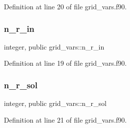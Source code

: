 Definition at line 20 of file grid\+\_\+vars.\+f90.

\mbox{\label{namespacegrid__vars_ad1047cc6f07720d61c8e6fdc3c68a317}} 
\subsubsection{\texorpdfstring{n\+\_\+r\+\_\+in}{n\_r\_in}}
{\footnotesize\ttfamily integer, public grid\+\_\+vars\+::n\+\_\+r\+\_\+in}



Definition at line 19 of file grid\+\_\+vars.\+f90.

\mbox{\label{namespacegrid__vars_ad998db12a656afb94d2d54a7d0eca642}} 
\subsubsection{\texorpdfstring{n\+\_\+r\+\_\+sol}{n\_r\_sol}}
{\footnotesize\ttfamily integer, public grid\+\_\+vars\+::n\+\_\+r\+\_\+sol}



Definition at line 21 of file grid\+\_\+vars.\+f90.

